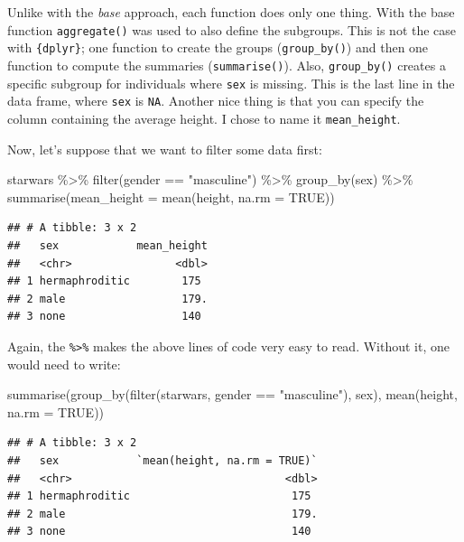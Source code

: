 \documentclass[
]{article}
\newenvironment{Shaded}{\begin{snugshade}}{\end{snugshade}}
\newcommand{\AttributeTok}[1]{\textcolor[rgb]{0.77,0.63,0.00}{#1}}
\newcommand{\ConstantTok}[1]{\textcolor[rgb]{0.00,0.00,0.00}{#1}}
\newcommand{\FunctionTok}[1]{\textcolor[rgb]{0.00,0.00,0.00}{#1}}
\newcommand{\NormalTok}[1]{#1}
\newcommand{\SpecialCharTok}[1]{\textcolor[rgb]{0.00,0.00,0.00}{#1}}
\newcommand{\StringTok}[1]{\textcolor[rgb]{0.31,0.60,0.02}{#1}}
\begin{document}
Unlike with the \emph{base} approach, each function does only one thing. With the base function
\texttt{aggregate()} was used to also define the subgroups. This is not the case with \texttt{\{dplyr\}}; one
function to create the groups (\texttt{group\_by()}) and then one function to compute the summaries
(\texttt{summarise()}). Also, \texttt{group\_by()} creates a specific subgroup for individuals where \texttt{sex} is
missing. This is the last line in the data frame, where \texttt{sex} is \texttt{NA}. Another nice thing is that
you can specify the column containing the average height. I chose to name it \texttt{mean\_height}.

Now, let's suppose that we want to filter some data first:

\begin{Shaded}
\begin{Highlighting}[]
\NormalTok{starwars }\SpecialCharTok{\%\textgreater{}\%}
  \FunctionTok{filter}\NormalTok{(gender }\SpecialCharTok{==} \StringTok{"masculine"}\NormalTok{) }\SpecialCharTok{\%\textgreater{}\%}
  \FunctionTok{group\_by}\NormalTok{(sex) }\SpecialCharTok{\%\textgreater{}\%}
  \FunctionTok{summarise}\NormalTok{(}\AttributeTok{mean\_height =} \FunctionTok{mean}\NormalTok{(height, }\AttributeTok{na.rm =} \ConstantTok{TRUE}\NormalTok{))}
\end{Highlighting}
\end{Shaded}

\begin{verbatim}
## # A tibble: 3 x 2
##   sex            mean_height
##   <chr>                <dbl>
## 1 hermaphroditic        175 
## 2 male                  179.
## 3 none                  140
\end{verbatim}

Again, the \texttt{\%\textgreater{}\%} makes the above lines of code very easy to read. Without it, one would need to
write:

\begin{Shaded}
\begin{Highlighting}[]
\FunctionTok{summarise}\NormalTok{(}\FunctionTok{group\_by}\NormalTok{(}\FunctionTok{filter}\NormalTok{(starwars, gender }\SpecialCharTok{==} \StringTok{"masculine"}\NormalTok{), sex), }\FunctionTok{mean}\NormalTok{(height, }\AttributeTok{na.rm =} \ConstantTok{TRUE}\NormalTok{))}
\end{Highlighting}
\end{Shaded}

\begin{verbatim}
## # A tibble: 3 x 2
##   sex            `mean(height, na.rm = TRUE)`
##   <chr>                                 <dbl>
## 1 hermaphroditic                         175 
## 2 male                                   179.
## 3 none                                   140
\end{verbatim}
\end{document}

